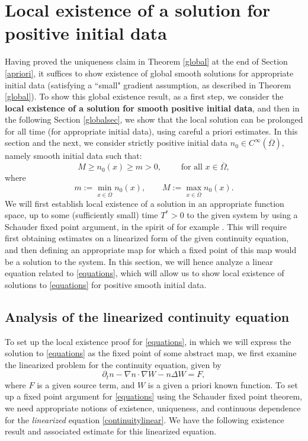 \documentclass[12pt]{article}
\theoremstyle{plain}
\begin{document}
\section{Local existence of a solution for positive initial data}\label{localexistencesec}

Having proved the uniqueness claim in Theorem \ref{global} at the end of Section \ref{apriori}, it suffices to show existence of global smooth solutions for appropriate initial data (satisfying a ``small" gradient assumption, as described in Theorem \ref{global}). To show this global existence result, as a first step, we consider the \textbf{local existence of a solution for smooth positive initial data}, and then in the following Section \ref{globalsec}, we show that the local solution can be prolonged for all time (for appropriate initial data), using careful a priori estimates. In this section and the next, we consider strictly positive initial data $n_{0} \in C^{\infty}(\overline{\Omega})$, namely smooth initial data such that:
\begin{equation*}
M \ge n_{0}(x) \ge m > 0, \qquad \text{ for all } x \in \overline{\Omega},
\end{equation*}
where
\begin{equation}\label{Mmdef}
m := \min_{x \in \overline{\Omega}} n_{0}(x), \qquad M := \max_{x \in \overline{\Omega}} n_{0}(x).
\end{equation}
We will first establish local existence of a solution in an appropriate function space, up to some (sufficiently small) time $T^{*} > 0$ to the given system by using a Schauder fixed point argument, in the spirit of for example \cite{Valli}. This will require first obtaining estimates on a linearized form of the given continuity equation, and then defining an appropriate map for which a fixed point of this map would be a solution to the system. In this section, we will hence analyze a linear equation related to \eqref{equations}, which will allow us to show local existence of solutions to \eqref{equations} for positive smooth initial data.

\subsection{Analysis of the linearized continuity equation}\label{linearized}

To set up the local existence proof for \eqref{equations}, in which we will express the solution to \eqref{equations} as the fixed point of some abstract map, we first examine the linearized problem for the continuity equation, given by
\begin{equation}\label{continuitylinear}
\partial_{t}n - \nabla n \cdot \nabla W - n \Delta W = F,
\end{equation}
where $F$ is a given source term, and $W$ is a given a priori known function. To set up a fixed point argument for \eqref{equations} using the Schauder fixed point theorem, we need appropriate notions of existence, uniqueness, and continuous dependence for the \textit{linearized} equation \eqref{continuitylinear}. We have the following existence result and associated estimate for this linearized equation.
\end{document}

